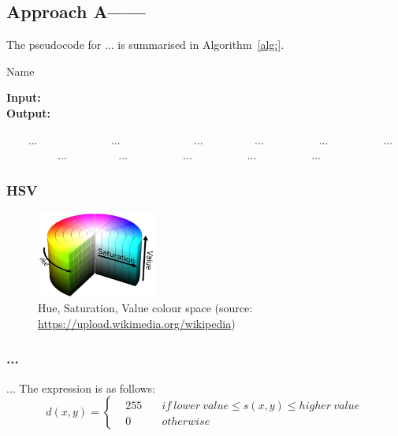\subsection{Approach A——}
The pseudocode for ... is summarised in Algorithm~\ref{alg:}.  

\begin{algorithm}[htb]
\label{alg:}
\caption{Name} %
\hspace*{0.02in} {\bf Input:} \\%
\hspace*{0.02in} {\bf Output:} %
\begin{algorithmic}[1]

　　\State ...
　　　　\State ...
　　\Else
　　　　\State ...
　　\EndIf
　　\State ...
　　    \State ... 
　　        \State ...
　　    \Else
　　        \State ...
　　    \EndIf
　　\State ...
　　    \State ...
　　\Else
　　    \State ...
　　\EndIf
　　\EndFor
\EndFor
\State \Return ...
\end{algorithmic}
\end{algorithm}


\subsubsection{HSV}

\begin{figure}[htb]
    \centering
    \includegraphics[width=0.35\textwidth]{images/HSV.png}
    \caption{Hue, Saturation, Value colour space (source: \url{https://upload.wikimedia.org/wikipedia})}
    \label{fig:HSV diagram}
\end{figure}

\subsubsection{...}
... The expression is as follows:
\begin{equation}
    d(x, y) = \left\{\begin{matrix}
    &255& \quad if\ lower\ value\le s(x, y)\le higher\ value \\
    &0& \quad otherwise
    \end{matrix}\right.
\end{equation}

